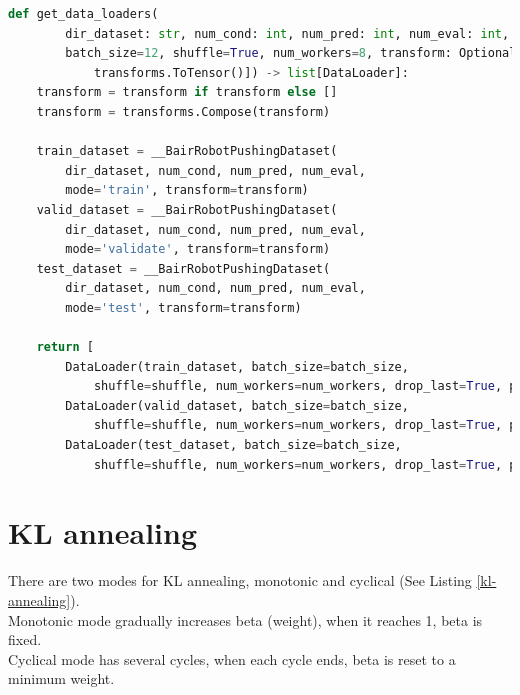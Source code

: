 \begin{lstlisting}[language=Python, caption={Python code of \textcolor{blue}{\textbf{get\_data\_loaders}} (some code is omitted).}, label={dataloader}]
def get_data_loaders(
        dir_dataset: str, num_cond: int, num_pred: int, num_eval: int, 
        batch_size=12, shuffle=True, num_workers=8, transform: Optional[list]=[
            transforms.ToTensor()]) -> list[DataLoader]:
    transform = transform if transform else []
    transform = transforms.Compose(transform)

    train_dataset = __BairRobotPushingDataset(
        dir_dataset, num_cond, num_pred, num_eval, 
        mode='train', transform=transform)
    valid_dataset = __BairRobotPushingDataset(
        dir_dataset, num_cond, num_pred, num_eval, 
        mode='validate', transform=transform)
    test_dataset = __BairRobotPushingDataset(
        dir_dataset, num_cond, num_pred, num_eval, 
        mode='test', transform=transform)
    
    return [
        DataLoader(train_dataset, batch_size=batch_size, 
            shuffle=shuffle, num_workers=num_workers, drop_last=True, pin_memory=True), 
        DataLoader(valid_dataset, batch_size=batch_size, 
            shuffle=shuffle, num_workers=num_workers, drop_last=True, pin_memory=True), 
        DataLoader(test_dataset, batch_size=batch_size, 
            shuffle=shuffle, num_workers=num_workers, drop_last=True, pin_memory=True)]\end{lstlisting}

\section{KL annealing}
\indent
    There are two modes for KL annealing, monotonic and cyclical (See Listing \ref{kl-annealing}). \\
    Monotonic mode gradually increases beta (weight), when it reaches 1, beta is fixed. \\
    Cyclical mode has several cycles, when each cycle ends, beta is reset to a minimum weight.

